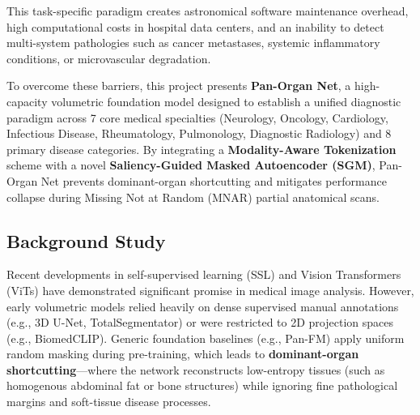 \documentclass[11pt,a4paper]{article}
\begin{document}
This task-specific paradigm creates astronomical software maintenance overhead, high computational costs in hospital data centers, and an inability to detect multi-system pathologies such as cancer metastases, systemic inflammatory conditions, or microvascular degradation.

To overcome these barriers, this project presents \textbf{Pan-Organ Net}, a high-capacity volumetric foundation model designed to establish a unified diagnostic paradigm across 7 core medical specialties (Neurology, Oncology, Cardiology, Infectious Disease, Rheumatology, Pulmonology, Diagnostic Radiology) and 8 primary disease categories. By integrating a \textbf{Modality-Aware Tokenization} scheme with a novel \textbf{Saliency-Guided Masked Autoencoder (SGM)}, Pan-Organ Net prevents dominant-organ shortcutting and mitigates performance collapse during Missing Not at Random (MNAR) partial anatomical scans.

\subsection{Background Study}
Recent developments in self-supervised learning (SSL) and Vision Transformers (ViTs) have demonstrated significant promise in medical image analysis. However, early volumetric models relied heavily on dense supervised manual annotations (e.g., 3D U-Net, TotalSegmentator) or were restricted to 2D projection spaces (e.g., BiomedCLIP). Generic foundation baselines (e.g., Pan-FM) apply uniform random masking during pre-training, which leads to \textbf{dominant-organ shortcutting}—where the network reconstructs low-entropy tissues (such as homogenous abdominal fat or bone structures) while ignoring fine pathological margins and soft-tissue disease processes.
\end{document}
